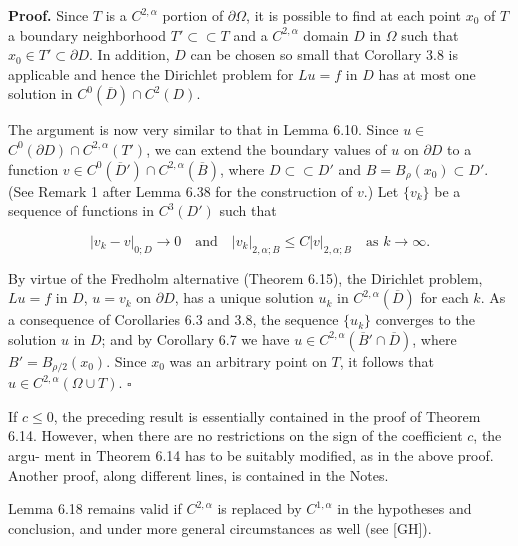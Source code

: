\begin{flushleft}
\textbf{Proof.} Since $T$ is a $C^{2,\alpha}$ portion of $\partial \Omega$, it is possible to find at each point $x_0$ of
$T$ a boundary neighborhood $T' \subset \subset T$ and a $C^{2,\alpha}$ domain $D$ in $\Omega$ such that $x_0 \in
T' \subset \partial D$. In addition, $D$ can be chosen so small that Corollary 3.8 is applicable
and hence the Dirichlet problem for $Lu = f$ in $D$ has at most one solution in
$C^0(\overline{D}) \cap C^2(D)$.
\end{flushleft}

\begin{flushleft}
The argument is now very similar to that in Lemma 6.10. Since $u \in$
$C^0(\partial D) \cap C^{2,\alpha}(T')$, we can extend the boundary values of $u$ on $\partial D$ to a function
$v \in C^0(\overline{D}') \cap C^{2,\alpha}(\overline{B})$, where $D \subset \subset D'$ and $B = B_\rho(x_0) \subset D'$. (See Remark 1 after
Lemma 6.38 for the construction of $v$.) Let $\{v_k\}$ be a sequence of functions in
$C^3(D')$ such that
\end{flushleft}

\[
|v_k - v|_{0;D} \to 0 \quad \text{and} \quad |v_k|_{2,\alpha;B} \le C|v|_{2,\alpha;B} \quad \text{as } k \to \infty.
\]

\begin{flushleft}
By virtue of the Fredholm alternative (Theorem 6.15), the Dirichlet problem,
$Lu = f$ in $D$, $u = v_k$ on $\partial D$, has a unique solution $u_k$ in $C^{2,\alpha}(\overline{D})$ for each $k$. As a
consequence of Corollaries 6.3 and 3.8, the sequence $\{u_k\}$ converges to the solution
$u$ in $D$; and by Corollary 6.7 we have $u \in C^{2,\alpha}(\overline{B}' \cap \overline{D})$, where $B' = B_{\rho/2}(x_0)$. Since
$x_0$ was an arbitrary point on $T$, it follows that $u \in C^{2,\alpha}(\Omega \cup T)$. $\square$
\end{flushleft}

\begin{flushleft}
If $c \le 0$, the preceding result is essentially contained in the proof of Theorem 6.14.
However, when there are no restrictions on the sign of the coefficient $c$, the argu-
ment in Theorem 6.14 has to be suitably modified, as in the above proof. Another
proof, along different lines, is contained in the Notes.
\end{flushleft}

\begin{flushleft}
Lemma 6.18 remains valid if $C^{2,\alpha}$ is replaced by $C^{1,\alpha}$ in the hypotheses and
conclusion, and under more general circumstances as well (see [GH]).
\end{flushleft}

